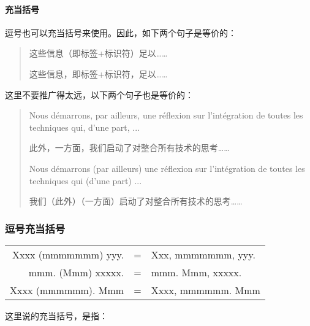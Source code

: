 \paragraph{充当括号}

逗号也可以充当括号来使用。因此，如下两个句子是等价的：

\begin{quote}
    这些信息（即标签+标识符）足以……

    这些信息，即标签+标识符，足以……
\end{quote}

这里不要推广得太远，以下两个句子也是等价的：

\begin{quote}
    Nous démarrons, par ailleurs, une réflexion sur l’intégration de toutes les techniques qui, d’une part, ...

    \begin{bil}
        此外，一方面，我们启动了对整合所有技术的思考……
    \end{bil}

    Nous démarrons (par ailleurs) une réflexion sur l’intégration de toutes les techniques qui (d’une part) ...

    \begin{bil}
        我们（此外）（一方面）启动了对整合所有技术的思考……
    \end{bil}
\end{quote}

\begin{mdframed}
    \subsubsection*{逗号充当括号}

    \begin{tabular}{rcl}
        Xxxx (mmmmmmm) yyy. & = & Xxx, mmmmmmm, yyy.\\
        mmm. (Mmm) xxxxx. & = & mmm. Mmm, xxxxx.\\
        Xxxx (mmmmmm). Mmm & = & Xxxx, mmmmmm. Mmm
    \end{tabular}
\end{mdframed}

这里说的充当括号，是指：

